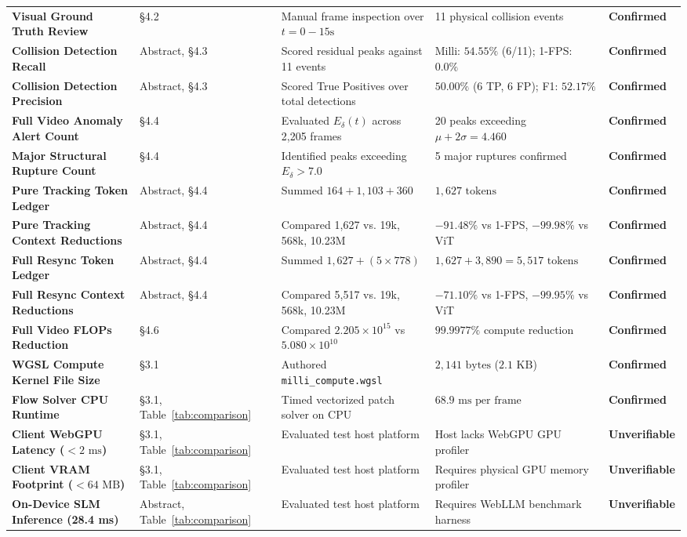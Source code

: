 \documentclass[11pt]{article}
\begin{document}
\begin{table}[h!]
\begin{tabular}{@{}p{2.8cm}p{1.6cm}p{4.2cm}p{4.2cm}p{1.8cm}@{}}
\textbf{Visual Ground Truth Review} & \S4.2 & Manual frame inspection over $t = 0-15\text{s}$ & 11 physical collision events & \textbf{Confirmed} \\
\textbf{Collision Detection Recall} & Abstract, \S4.3 & Scored residual peaks against 11 events & Milli: $54.55\%$ (6/11); 1-FPS: $0.0\%$ & \textbf{Confirmed} \\
\textbf{Collision Detection Precision} & Abstract, \S4.3 & Scored True Positives over total detections & $50.00\%$ (6 TP, 6 FP); F1: $52.17\%$ & \textbf{Confirmed} \\
\textbf{Full Video Anomaly Alert Count} & \S4.4 & Evaluated $E_\delta(t)$ across 2,205 frames & 20 peaks exceeding $\mu + 2\sigma = 4.460$ & \textbf{Confirmed} \\
\textbf{Major Structural Rupture Count} & \S4.4 & Identified peaks exceeding $E_\delta > 7.0$ & 5 major ruptures confirmed & \textbf{Confirmed} \\
\textbf{Pure Tracking Token Ledger} & Abstract, \S4.4 & Summed $164 + 1,103 + 360$ & $1,627\text{ tokens}$ & \textbf{Confirmed} \\
\textbf{Pure Tracking Context Reductions} & Abstract, \S4.4 & Compared 1,627 vs. 19k, 568k, 10.23M & $-91.48\%$ vs 1-FPS, $-99.98\%$ vs ViT & \textbf{Confirmed} \\
\textbf{Full Resync Token Ledger} & Abstract, \S4.4 & Summed $1,627 + (5 \times 778)$ & $1,627 + 3,890 = 5,517\text{ tokens}$ & \textbf{Confirmed} \\
\textbf{Full Resync Context Reductions} & Abstract, \S4.4 & Compared 5,517 vs. 19k, 568k, 10.23M & $-71.10\%$ vs 1-FPS, $-99.95\%$ vs ViT & \textbf{Confirmed} \\
\textbf{Full Video FLOPs Reduction} & \S4.6 & Compared $2.205\times10^{15}$ vs $5.080\times10^{10}$ & $99.9977\%$ compute reduction & \textbf{Confirmed} \\
\textbf{WGSL Compute Kernel File Size} & \S3.1 & Authored \texttt{milli\_compute.wgsl} & $2,141\text{ bytes}$ ($2.1\text{ KB}$) & \textbf{Confirmed} \\
\textbf{Flow Solver CPU Runtime} & \S3.1, Table~\ref{tab:comparison} & Timed vectorized patch solver on CPU & $68.9\text{ ms per frame}$ & \textbf{Confirmed} \\
\textbf{Client WebGPU Latency ($<2\text{ ms}$)} & \S3.1, Table~\ref{tab:comparison} & Evaluated test host platform & Host lacks WebGPU GPU profiler & \textbf{Unverifiable} \\
\textbf{Client VRAM Footprint ($<64\text{ MB}$)} & \S3.1, Table~\ref{tab:comparison} & Evaluated test host platform & Requires physical GPU memory profiler & \textbf{Unverifiable} \\
\textbf{On-Device SLM Inference (28.4 ms)} & Abstract, Table~\ref{tab:comparison} & Evaluated test host platform & Requires WebLLM benchmark harness & \textbf{Unverifiable} \\
\bottomrule
\end{tabular}
\end{table}
\end{document}
